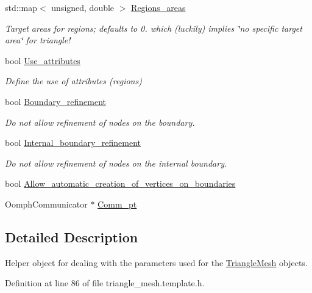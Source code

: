 \begin{DoxyCompactItemize}
std\+::map$<$ unsigned, double $>$ \hyperlink{classoomph_1_1TriangleMeshParameters_acab056faae14c8124fed117bd24db277}{Regions\+\_\+areas}
\begin{DoxyCompactList}\small\item\em Target areas for regions; defaults to 0. which (luckily) implies \char`\"{}no specific target area\char`\"{} for triangle! \end{DoxyCompactList}\item 
bool \hyperlink{classoomph_1_1TriangleMeshParameters_ace3e9037373f215360c435dc85064db7}{Use\+\_\+attributes}
\begin{DoxyCompactList}\small\item\em Define the use of attributes (regions) \end{DoxyCompactList}\item 
bool \hyperlink{classoomph_1_1TriangleMeshParameters_a0a97e7b7a890c2584206eb6b584ae5f3}{Boundary\+\_\+refinement}
\begin{DoxyCompactList}\small\item\em Do not allow refinement of nodes on the boundary. \end{DoxyCompactList}\item 
bool \hyperlink{classoomph_1_1TriangleMeshParameters_a5d4823276b94bc4b3d4dbbd8d351596c}{Internal\+\_\+boundary\+\_\+refinement}
\begin{DoxyCompactList}\small\item\em Do not allow refinement of nodes on the internal boundary. \end{DoxyCompactList}\item 
bool \hyperlink{classoomph_1_1TriangleMeshParameters_abe02ff536c7f79016947f28a2ffc0b59}{Allow\+\_\+automatic\+\_\+creation\+\_\+of\+\_\+vertices\+\_\+on\+\_\+boundaries}
\item 
Oomph\+Communicator $\ast$ \hyperlink{classoomph_1_1TriangleMeshParameters_acf0912db2ab6a5f3f379c1839356ebd6}{Comm\+\_\+pt}
\end{DoxyCompactItemize}


\subsection{Detailed Description}
Helper object for dealing with the parameters used for the \hyperlink{classoomph_1_1TriangleMesh}{Triangle\+Mesh} objects. 

Definition at line 86 of file triangle\+\_\+mesh.\+template.\+h.



